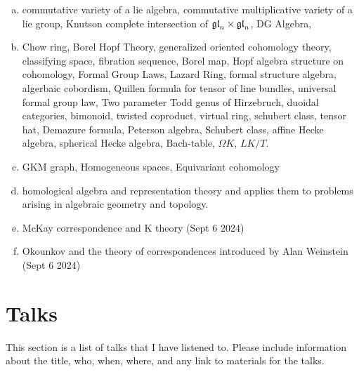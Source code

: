 \documentclass[12pt]{article}
\begin{document}
\begin{enumerate}[(a)]
    \item commutative variety of a lie algebra, commutative multiplicative variety of a lie group, Knutson complete intersection of $\mathfrak{gl}_n\times\mathfrak{gl}_n$, DG Algebra,
    \item Chow ring, Borel Hopf Theory, generalized oriented cohomology theory, classifying space, fibration sequence, Borel map, Hopf algebra structure on cohomology, Formal Group Laws, Lazard Ring, formal structure algebra, algerbaic cobordism, Quillen formula for tensor of line bundles, universal formal group law,
            Two parameter Todd genus of Hirzebruch, duoidal categories, bimonoid, twisted coproduct, virtual ring, schubert class, tensor hat, Demazure formula, Peterson algebra, Schubert class, affine Hecke algebra, spherical Hecke algebra, Bach-table, $\Omega K$, $LK/T$.
    \item GKM graph, Homogeneous spaces, Equivariant cohomology
    \item homological algebra and representation theory and applies them to problems arising in algebraic geometry and topology. 
    \item McKay correspondence and K theory (Sept 6 2024)
    \item Okounkov and the theory of correspondences introduced by Alan Weinstein (Sept 6 2024)
\end{enumerate}

\section{Talks}
This section is a list of talks that I have listened to. Please include information about the title, who, when, where, and any link to materials for the talks.
    
\end{document}
